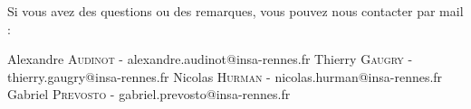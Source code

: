 Si vous avez des questions ou des remarques, vous pouvez nous contacter par mail :

Alexandre \textsc{Audinot} - alexandre.audinot@insa-rennes.fr
Thierry \textsc{Gaugry} - thierry.gaugry@insa-rennes.fr
Nicolas \textsc{Hurman} - nicolas.hurman@insa-rennes.fr
Gabriel \textsc{Prevosto} - gabriel.prevosto@insa-rennes.fr